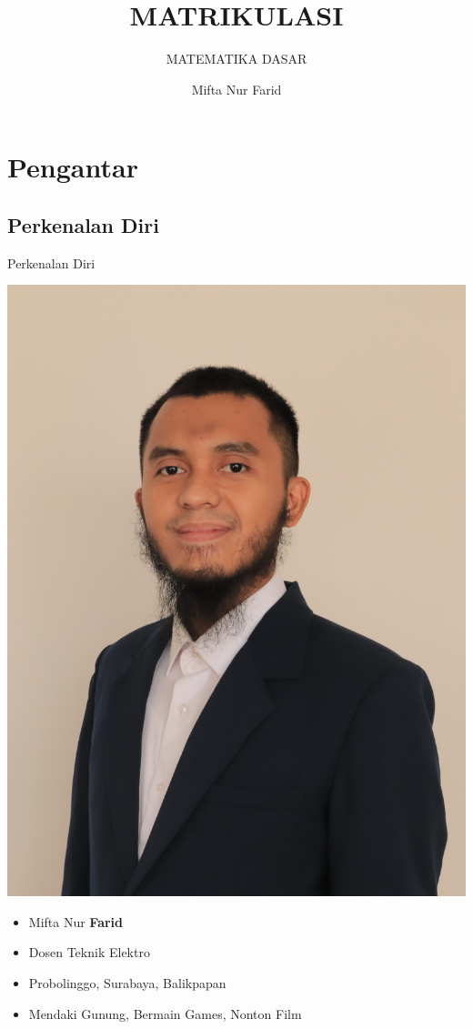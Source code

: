 \documentclass[pdflatex,compress,mathserif]{beamer}
\title{MATRIKULASI}
\subtitle{MATEMATIKA DASAR}
\author{Mifta Nur Farid}
\begin{document}
\maketitle

\section{Pengantar}

	\subsection{Perkenalan Diri}
		\begin{frame}{Perkenalan Diri}
			\begin{multicols}{2}
				\begin{center}
					\includegraphics[width=0.7\linewidth]{pict/00}
				\end{center}
				\begin{itemize}
					\item Mifta Nur \textbf{Farid}
					\item Dosen Teknik Elektro
					\item Probolinggo, Surabaya, Balikpapan
					\item Mendaki Gunung, Bermain Games, Nonton Film
				\end{itemize}
				\columnbreak
			\end{multicols}
		\end{frame}
	
\end{document}
